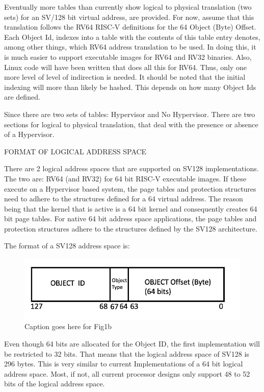 \documentclass{article}
\begin{document}
Eventually more tables than currently show logical to physical translation (two sets) for an SV/128 bit virtual address, are provided.    For now, assume that this translation follows the RV64 RISC-V definitions for the 64 Object  (Byte) Offset.  Each Object Id,  indexes into a table   with the contents of this table entry denotes, among other things,  which RV64 address translation to be used.   In doing this,   it is much easier to support executable images for RV64 and RV32 binaries.  Also, Linux code will have been written that does all this for RV64.  Thus, only one more level of level of indirection is needed. It should be noted that the initial  indexing will more than likely be hashed.  This depends on how many Object Ids  are defined.

Since there are two sets of tables:  Hypervisor and No  Hypervisor.   There are two sections for logical to physical translation,  that deal with the presence or absence of a Hypervisor.

FORMAT OF LOGICAL ADDRESS SPACE

There are 2   logical address spaces that are supported on SV128 implementations.  The two are: RV64 (and RV32) for 64 bit RISC-V executable images. If these execute on a Hypervisor based system,  the page tables and protection structures need to adhere to the  structures defined for a 64 virtual address. The reason being that the kernel that is active is a 64 bit kernel and consequently creates 64  bit page tables. For native 64 bit address space applications,  the page tables and protection structures adhere to the structures defined by the SV128 architecture.



The format of a SV128 address space is:



\begin{figure}[h]
\includegraphics[scale = .4]
{figures/figure1b_objectid_image.jpg}
\caption{Caption goes here for Fig1b}
\end{figure}


Even though 64 bits are allocated for the Object ID,  the first implementation will be restricted to 32 bits.  That  means that the logical address space of SV128 is 296  bytes.  This is  very similar to current Implementations of a 64 bit logical address space.  Most, if not, all current processor designs  only support 48 to 52 bits of the logical address space.
\end{document}
